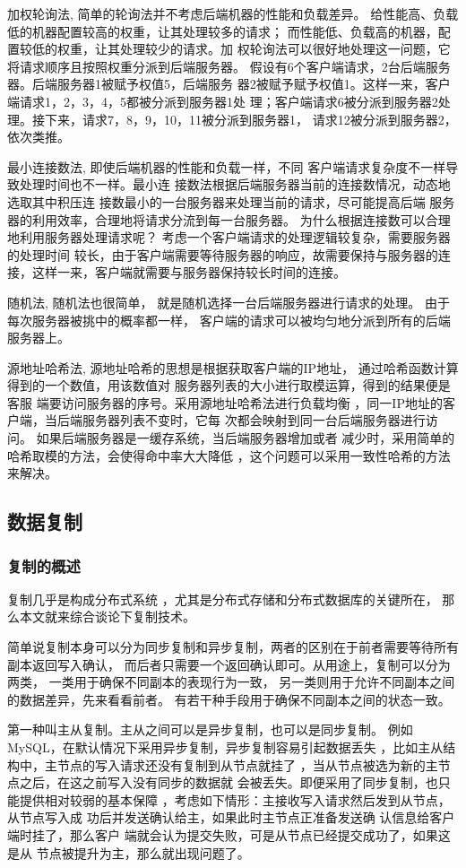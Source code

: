 加权轮询法,
简单的轮询法并不考虑后端机器的性能和负载差异。
给性能高、负载低的机器配置较高的权重，让其处理较多的请求；
而性能低、负载高的机器，配置较低的权重，让其处理较少的请求。加
权轮询法可以很好地处理这一问题，它将请求顺序且按照权重分派到后端服务器。 
假设有6个客户端请求，2台后端服务器。后端服务器1被赋予权值5，后端服务
器2被赋予赋予权值1。这样一来，客户端请求1，2，3，4，5都被分派到服务器1处
理；客户端请求6被分派到服务器2处理。接下来，请求7，8，9，10，11被分派到服务器1，
请求12被分派到服务器2，依次类推。

最小连接数法,
即使后端机器的性能和负载一样，不同
客户端请求复杂度不一样导致处理时间也不一样。最小连
接数法根据后端服务器当前的连接数情况，动态地选取其中积压连
接数最小的一台服务器来处理当前的请求，尽可能提高后端
服务器的利用效率，合理地将请求分流到每一台服务器。 
为什么根据连接数可以合理地利用服务器处理请求呢？ 
考虑一个客户端请求的处理逻辑较复杂，需要服务器的处理时间
较长，由于客户端需要等待服务器的响应，故需要保持与服务器的连
接，这样一来，客户端就需要与服务器保持较长时间的连接。 

随机法,
随机法也很简单，
就是随机选择一台后端服务器进行请求的处理。
由于每次服务器被挑中的概率都一样，
客户端的请求可以被均匀地分派到所有的后端服务器上。

源地址哈希法,
源地址哈希的思想是根据获取客户端的IP地址，
通过哈希函数计算得到的一个数值，用该数值对
服务器列表的大小进行取模运算，得到的结果便是客服
端要访问服务器的序号。采用源地址哈希法进行负载均衡
，同一IP地址的客户端，当后端服务器列表不变时，它每
次都会映射到同一台后端服务器进行访问。 
如果后端服务器是一缓存系统，当后端服务器增加或者
减少时，采用简单的哈希取模的方法，会使得命中率大大降低
，这个问题可以采用一致性哈希的方法来解决。 
\subsection{数据复制}
\subsubsection{复制的概述}
复制几乎是构成分布式系统
，尤其是分布式存储和分布式数据库的关键所在，
那么本文就来综合谈论下复制技术。

简单说复制本身可以分为同步复制和异步复制，两者的区别在于前者需要等待所有副本返回写入确认，
而后者只需要一个返回确认即可。从用途上，复制可以分为两类，
一类用于确保不同副本的表现行为一致，
另一类则用于允许不同副本之间的数据差异，先来看看前者。
有若干种手段用于确保不同副本之间的状态一致。

第一种叫主从复制。主从之间可以是异步复制，也可以是同步复制。
例如MySQL，在默认情况下采用异步复制，异步复制容易引起数据丢失
，比如主从结构中，主节点的写入请求还没有复制到从节点就挂了
，当从节点被选为新的主节点之后，在这之前写入没有同步的数据就
会被丢失。即便采用了同步复制，也只能提供相对较弱的基本保障
，考虑如下情形：主接收写入请求然后发到从节点，从节点写入成
功后并发送确认给主，如果此时主节点正准备发送确
认信息给客户端时挂了，那么客户
端就会认为提交失败，可是从节点已经提交成功了，如果这是从
节点被提升为主，那么就出现问题了。

